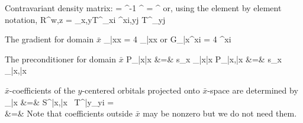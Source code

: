 \documentclass[aps,prl,twocolumn,reprint,amsmath,amssymb]{revtex4-1}
\begin{document}
Contravariant density matrix:
%
\bea
{} =  \sigma^{-1} ^{\dagger}
\sigma = ^{\dagger}  
\eea
%
or, using the element by element notation,
%
\bea
R^{w\mu,z\nu} = \sum_{x,y}{T^{\mu}}_{xi} \sigma^{xi,yj} {T^{\nu}}_{yj}
\eea

The gradient for domain $\bar{x}$
%
\bea
{}_{\bar{x}x} = 4 _{\bar{x}x}
\eea
%
or
%
\bea
{G_{\bar{x}\mu}}^{xi} = 4 ^{xi}
\eea
%

The preconditioner for domain $\bar{x}$
%
\bea
P_{\bar{x}\bar{x}} &=& s_x _{\bar{x}\bar{x}} 
\eea 
%
\bea
P_{\bar{x}\mu,\bar{x}\nu} &=& s_x _{\bar{x}\mu,\bar{x}\nu} 
\eea 

$\bar{x}$-coefficients of the $y$-centered orbitals projected onto $\bar{x}$-space are determined by
%
\bea
{}_{\bar{x}}   &=&  S^{\bar{x}\mu,\bar{x}\nu} \, {T^{\bar{y}\lambda}}_{yi} = \nonumber \\
 &=&  
\eea 
%
Note that coefficients outside $\bar{x}$ may be nonzero but we do not need them.
\end{document}
